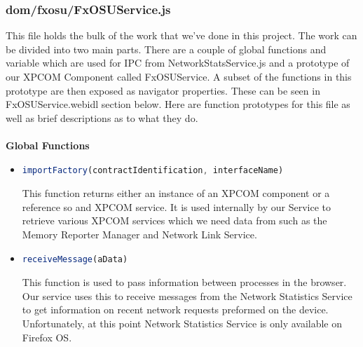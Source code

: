 \documentclass[12pt]{article}
\begin{document}
\subsubsection{dom/fxosu/FxOSUService.js}
This file holds the bulk of the work that we've done in this project. The work can be divided into two main parts.  There are a couple of global functions and variable which are used for IPC from NetworkStatsService.js and a prototype of our XPCOM Component called FxOSUService.  A subset of the functions in this prototype are then exposed as navigator properties.  These can be seen in FxOSUService.webidl section below.  Here are function prototypes for this file as well as brief descriptions as to what they do.
\\\\
\textbf{Global Functions}
\begin{itemize}
  \item \begin{lstlisting}[language=JavaScript]
importFactory(contractIdentification, interfaceName)
    \end{lstlisting}
    This function returns either an instance of an XPCOM component or a reference so and XPCOM service.  It is used internally by our Service to retrieve various XPCOM services which we need data from such as the Memory Reporter Manager and Network Link Service.  \\ 
  \item \begin{lstlisting}[language=JavaScript]
receiveMessage(aData)
    \end{lstlisting}
    This function is used to pass information between processes in the browser.  Our service uses this to receive messages from the Network Statistics Service to get information on recent network requests preformed on the device.  Unfortunately, at this point Network Statistics Service is only available on Firefox OS. 
\end{itemize}
\end{document}
